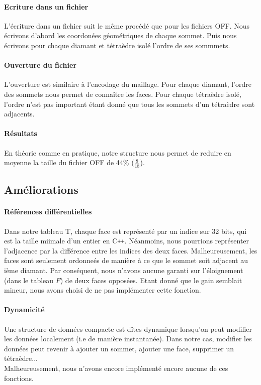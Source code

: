 \documentclass[a4paper,11pt,openany]{article}
\begin{document}
\paragraph{Ecriture dans un fichier}
L'écriture dans un fichier suit le même procédé que pour les fichiers OFF. Nous écrivons d'abord les coordonées géométriques de chaque sommet. Puis nous écrivons pour chaque diamant et tétraèdre isolé l'ordre de ses sommmets.

\paragraph{Ouverture du fichier}
L'ouverture est similaire à l'encodage du maillage. Pour chaque diamant, l'ordre des sommets nous permet de connaître les faces. Pour chaque tétraèdre isolé, l'ordre n'est pas important étant donné que tous les sommets d'un tétraèdre sont adjacents.

\paragraph{Résultats}
En théorie comme en pratique, notre structure nous permet de reduire en moyenne la taille du fichier OFF de 44\% ($\frac{8}{18}$).

\subsection{Améliorations}
\paragraph{Références différentielles}
Dans notre tableau T, chaque face est représenté par un indice sur 32 bits, qui est la taille miimale d'un entier en C\texttt{++}. Néanmoins, nous pourrions représenter l'adjacence par la différence entre les indices des deux faces. Malheureusement, les faces sont seulement ordonneés de manière à ce que le sommet soit adjacent au ième diamant. Par conséquent, nous n'avons aucune garanti sur l'éloignement (dans le tableau $F$) de deux faces opposées. Etant donné que le gain semblait mineur, nous avons choisi de ne pas implémenter cette fonction.

\paragraph{Dynamicité}
Une structure de données compacte est dîtes dynamique lorsqu'on peut modifier les données localement (i.e de manière instantanée). Dans notre cas, modifier les données peut revenir à ajouter un sommet, ajouter une face, supprimer un tétraèdre...\\
Malheureusement, nous n'avons encore implémenté encore aucune de ces fonctions.
\end{document}
